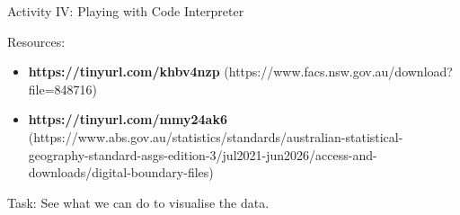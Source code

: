 \documentclass[aspectratio=169]{beamer}
\begin{document}
\begin{frame}{Activity IV: Playing with Code Interpreter}


Resources: 
\begin{itemize}
    \item \textbf{https://tinyurl.com/khbv4nzp} (https://www.facs.nsw.gov.au/download?file=848716)
    \item \textbf{https://tinyurl.com/mmy24ak6} (https://www.abs.gov.au/statistics/standards/australian-statistical-geography-standard-asgs-edition-3/jul2021-jun2026/access-and-downloads/digital-boundary-files)
\end{itemize}

Task: See what we can do to visualise the data.







    

\end{frame}
\end{document}
